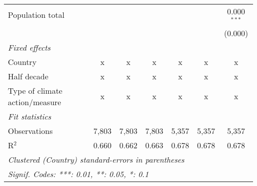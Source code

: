 \begin{tabular}{lcccccc}
   Population total                                              &         &                &                &                &                & 0.000$^{***}$\\   
                                                                 &         &                &                &                &                & (0.000)\\   
   \emph{Fixed effects}\\
   Country                                                       & x       & x              & x              & x              & x              & x\\  
   Half decade                                                   & x       & x              & x              & x              & x              & x\\  
   Type of climate action/measure                                & x       & x              & x              & x              & x              & x\\  
   \midrule \emph{Fit statistics}\\
   Observations                                                  & 7,803   & 7,803          & 7,803          & 5,357          & 5,357          & 5,357\\  
   R$^2$                                                         & 0.660   & 0.662          & 0.663          & 0.678          & 0.678          & 0.678\\  
   \midrule
   \multicolumn{7}{l}{\emph{Clustered (Country) standard-errors in parentheses}}\\
   \multicolumn{7}{l}{\emph{Signif. Codes: ***: 0.01, **: 0.05, *: 0.1}}\\
\end{tabular}
\par\endgroup


